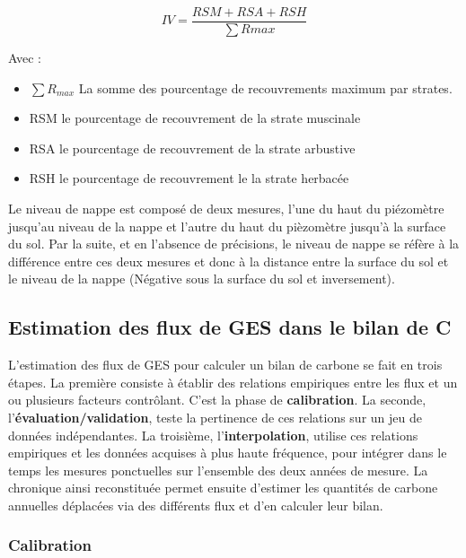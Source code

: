 \begin{equation}
IV = \frac{RSM + RSA + RSH}{\sum R{max}}
\end{equation}

Avec :
\begin{itemize}
\item $\sum R_{max}$ La somme des pourcentage de recouvrements maximum par strates.
\item RSM le pourcentage de recouvrement de la strate muscinale
\item RSA le pourcentage de recouvrement de la strate arbustive
\item RSH le pourcentage de recouvrement le la strate herbacée
\end{itemize}

Le niveau de nappe est composé de deux mesures, l'une du haut du piézomètre jusqu'au niveau de la nappe et l'autre du haut du pièzomètre jusqu'à la surface du sol. 
Par la suite, et en l'absence de précisions, le niveau de nappe se réfère à la différence entre ces deux mesures et donc à la distance entre la surface du sol et le niveau de la nappe (Négative sous la surface du sol et inversement).

\subsection{Estimation des flux de GES dans le bilan de C}

L'estimation des flux de GES pour calculer un bilan de carbone se fait en trois étapes.
La première consiste à établir des relations empiriques entre les flux et un ou plusieurs facteurs contrôlant.
C'est la phase de \textbf{calibration}.
La seconde, l'\textbf{évaluation/validation}, teste la pertinence de ces relations sur un jeu de données indépendantes.
La troisième, l'\textbf{interpolation}, utilise ces relations empiriques et les données acquises à plus haute fréquence, pour intégrer dans le temps les mesures ponctuelles sur l'ensemble des deux années de mesure. 
La chronique ainsi reconstituée permet ensuite d'estimer les quantités de carbone annuelles déplacées via des différents flux et d'en calculer leur bilan.

\subsubsection{Calibration}

